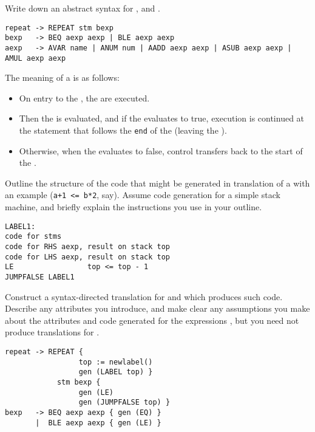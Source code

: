 \begin{questions}
\begin{subquestions}
\subsubquestion
Write down an abstract syntax for ,  and .
\begin{modelanswer}
\begin{verbatim}
repeat -> REPEAT stm bexp
bexp   -> BEQ aexp aexp | BLE aexp aexp
aexp   -> AVAR name | ANUM num | AADD aexp aexp | ASUB aexp aexp | AMUL aexp aexp
\end{verbatim}
\end{modelanswer}

\subquestion
The meaning of a  is as follows:
\begin{itemize}
\item On entry to the , the  are executed.
\item Then the  is evaluated, and if the  evaluates to
	true, execution is continued at the statement
	that follows the \verb+end+ of the  (leaving
	the ).
\item Otherwise, when the  evaluates to false,
        control transfers back to the start of the .
\end{itemize}
\begin{subsubquestions}
\subsubquestion
        Outline the structure of the
        code that might be generated in translation of
        a  with an example  (\verb"a+1 <= b*2", say). 
        Assume code generation for a simple stack machine, 
	and briefly explain the instructions you use in your outline.
\begin{modelanswer}
\begin{verbatim}
LABEL1:
code for stms
code for RHS aexp, result on stack top
code for LHS aexp, result on stack top
LE                 top <= top - 1
JUMPFALSE LABEL1
\end{verbatim}
\end{modelanswer}

\subsubquestion
        Construct a syntax-directed translation for 
         and  which produces such code.
        Describe any attributes you
        introduce, and make clear any assumptions you make about 
        the attributes and code generated for the
        expressions , but you need not produce translations for
        .

\begin{modelanswer}
\begin{verbatim}
repeat -> REPEAT {
                 top := newlabel()
                 gen (LABEL top) }
            stm bexp {
                 gen (LE)
                 gen (JUMPFALSE top) }
bexp   -> BEQ aexp aexp { gen (EQ) }
       |  BLE aexp aexp { gen (LE) }
\end{verbatim}
\end{modelanswer}



\end{subsubquestions}
\end{subquestions}
\end{questions}
